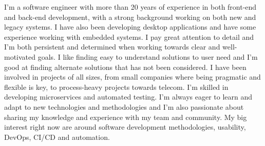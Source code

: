 \documentclass{cv-stylish}
\begin{document}
\begin{center} %



\vspace{1.0cm} %



\begin{adjustwidth}{1cm}{1cm}

%


I’m a software engineer with more than 20 years of experience in
both front-end and back-end development, with a strong background
working on both new and legacy systems.
I have also been developing desktop applications and have some
experience working with embedded systems.
I pay great attention to
detail and I’m both persistent and determined when working towards
clear and well-motivated goals.
I like finding easy to understand solutions to user need and I'm good
at finding alternate solutions that has not been considered.
 I have been involved in projects of
all sizes, from small companies where being pragmatic and flexible is
key, to process-heavy projects towards telecom. I'm skilled in developing
microservices and automated testing. I'm always
eager to learn and adapt to new technologies and methodologies and I’m
also passionate about sharing my knowledge and experience with my team
and community. My big interest right now are around software development
methodologies, usability, DevOps, CI/CD and automation.


\end{adjustwidth}
\end{center}
\end{document}
